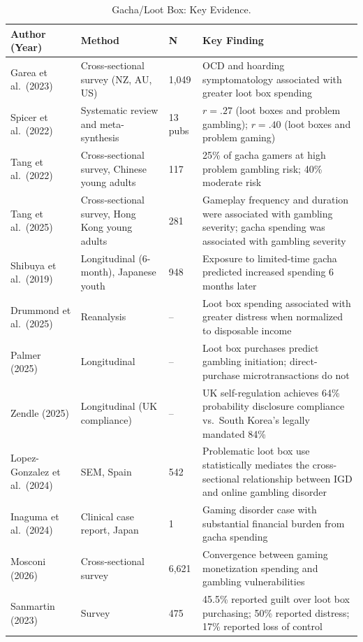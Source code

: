 \documentclass[12pt]{article}
\begin{document}
\begin{table}[ht]
\centering
\caption{Gacha/Loot Box: Key Evidence.}
\small
\begin{tabular}{p{3.2cm}p{3cm}p{1.5cm}p{6cm}}
\toprule
Author (Year) & Method & N & Key Finding \\
\midrule
Garea et al.\ (2023) & Cross-sectional survey (NZ, AU, US) & 1,049 & OCD and hoarding symptomatology associated with greater loot box spending \\
Spicer et al.\ (2022) & Systematic review and meta-synthesis & 13 pubs & $r = .27$ (loot boxes and problem gambling); $r = .40$ (loot boxes and problem gaming) \\
Tang et al.\ (2022) & Cross-sectional survey, Chinese young adults & 117 & 25\% of gacha gamers at high problem gambling risk; 40\% moderate risk \\
Tang et al.\ (2025) & Cross-sectional survey, Hong Kong young adults & 281 & Gameplay frequency and duration were associated with gambling severity; gacha spending was associated with gambling severity \\
Shibuya et al.\ (2019) & Longitudinal (6-month), Japanese youth & 948 & Exposure to limited-time gacha predicted increased spending 6 months later \\
Drummond et al.\ (2025) & Reanalysis & -- & Loot box spending associated with greater distress when normalized to disposable income \\
Palmer (2025) & Longitudinal & -- & Loot box purchases predict gambling initiation; direct-purchase microtransactions do not \\
Zendle (2025) & Longitudinal (UK compliance) & -- & UK self-regulation achieves 64\% probability disclosure compliance vs.\ South Korea's legally mandated 84\% \\
Lopez-Gonzalez et al.\ (2024) & SEM, Spain & 542 & Problematic loot box use statistically mediates the cross-sectional relationship between IGD and online gambling disorder \\
Inaguma et al.\ (2024) & Clinical case report, Japan & 1 & Gaming disorder case with substantial financial burden from gacha spending \\
Mosconi (2026) & Cross-sectional survey & 6,621 & Convergence between gaming monetization spending and gambling vulnerabilities \\
Sanmartin (2023) & Survey & 475 & 45.5\% reported guilt over loot box purchasing; 50\% reported distress; 17\% reported loss of control \\
\bottomrule
\end{tabular}
\end{table}
\end{document}
